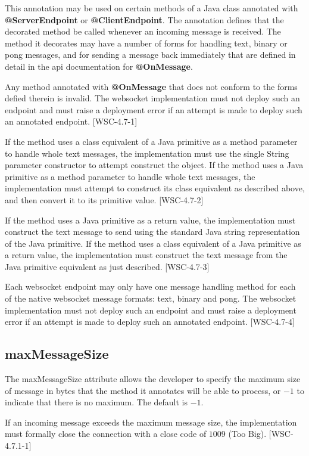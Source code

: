 This annotation may be used on certain methods of a Java class annotated with \textbf{@ServerEndpoint} or \textbf{@ClientEndpoint}. The annotation defines that the decorated method be called whenever an incoming message is received. The method it decorates may have a number of forms for handling text, binary or pong messages, and for sending a message back immediately that are defined in detail in the api documentation for \textbf{@OnMessage}.

Any method annotated with \textbf{@OnMessage} that does not conform to the forms defied therein is invalid. The websocket implementation must not deploy such an endpoint and must raise a deployment error if an attempt is made to deploy such an annotated endpoint. [WSC-4.7-1]

If the method uses a class equivalent of a Java primitive as a method parameter to handle whole text messages, the implementation must use the single String parameter constructor to attempt construct the object. If the method uses a Java primitive as a method parameter to handle whole text messages, the implementation must attempt to construct its class equivalent as described above, and then convert it to its primitive value. [WSC-4.7-2]

If the method uses a Java primitive as a return value, the implementation must construct the text message to send using the standard Java string representation of the Java primitive. If the method uses a class equivalent of a Java primitive as a return value, the implementation must construct the text message from the Java primitive equivalent as just described. [WSC-4.7-3]

Each websocket endpoint may only have one message handling method for each of the native websocket message formats: text, binary and pong. The websocket implementation must not deploy such an endpoint and must raise a deployment error if an attempt is made to deploy such an annotated endpoint. [WSC-4.7-4]

\subsection{maxMessageSize}

The maxMessageSize attribute allows the developer to specify the maximum size of message in bytes that the method it annotates will be able to process, or $-1$ to indicate that there is no maximum. The default is $-1$.

If an incoming message exceeds the maximum message size, the implementation must formally close the connection with a close code of $1009$ (Too Big).  [WSC-4.7.1-1]

